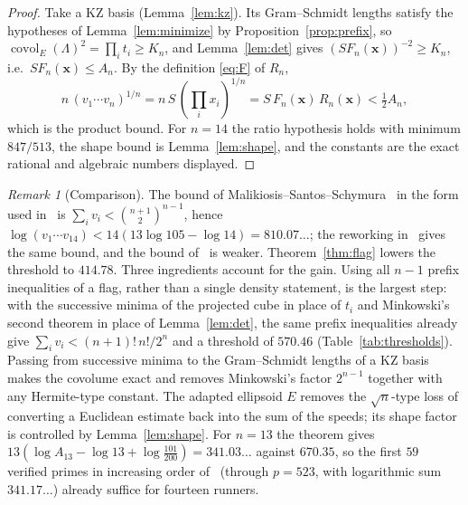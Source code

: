 \documentclass[11pt]{article}
\theoremstyle{definition}
\theoremstyle{remark}
\newtheorem{remark}[theorem]{Remark}
\newcommand{\vct}[1]{\mathbf{#1}}
\DeclareMathOperator{\covol}{covol}
\begin{document}
\begin{proof}
Take a KZ basis (Lemma~\ref{lem:kz}).  Its Gram--Schmidt lengths satisfy
the hypotheses of Lemma~\ref{lem:minimize} by Proposition~\ref{prop:prefix},
so $\covol_E(\Lambda)^2=\prod_it_i\geq K_n$, and Lemma~\ref{lem:det} gives
$(SF_n(\vct{x}))^{-2}\geq K_n$, i.e.\ $SF_n(\vct{x})\leq A_n$.  By the
definition \eqref{eq:F} of $R_n$,
\[
  n\,(v_1\cdots v_n)^{1/n}=n\,S\,(\textstyle\prod_ix_i)^{1/n}
  =S\,F_n(\vct{x})\,R_n(\vct{x})<\tfrac12A_n ,
\]
which is the product bound.  For $n=14$ the ratio hypothesis holds with
minimum $847/513$, the shape bound is Lemma~\ref{lem:shape}, and the
constants are the exact rational and algebraic numbers displayed.
\end{proof}

\begin{remark}[Comparison]\label{rem:compare}
The bound of Malikiosis--Santos--Schymura~\cite{MSS25} in the form used
in~\cite{ST26,Allikvere26} is $\sum_iv_i<\binom{n+1}{2}^{n-1}$, hence
$\log(v_1\cdots v_{14})<14(13\log105-\log14)=810.07\ldots$; the
reworking in~\cite{BCS26} gives the same bound, and the bound
of~\cite{GK26} is weaker.  Theorem~\ref{thm:flag} lowers the threshold
to $414.78$.  Three ingredients account for the gain.  Using all $n-1$
prefix inequalities of a flag, rather than a single density statement, is
the largest step: with the successive minima of the projected cube in
place of $t_i$ and Minkowski's second theorem in place of
Lemma~\ref{lem:det}, the same prefix inequalities already give
$\sum_iv_i<(n+1)!\,n!/2^n$ and a threshold of $570.46$
(Table~\ref{tab:thresholds}).  Passing from successive minima to the
Gram--Schmidt lengths of a KZ basis makes the covolume exact and removes
Minkowski's factor $2^{n-1}$ together with any Hermite-type constant.
The adapted ellipsoid $E$ removes the $\sqrt n$-type loss of converting a
Euclidean estimate back into the sum of the speeds; its shape factor is
controlled by Lemma~\ref{lem:shape}.  For $n=13$ the theorem gives
$13(\log A_{13}-\log13+\log\frac{101}{200})=341.03\ldots$ against
$670.35$, so the first $59$ verified primes in increasing order
of~\cite{Allikvere26} (through $p=523$, with logarithmic sum
$341.17\ldots$) already suffice for fourteen runners.
\end{remark}
\end{document}

